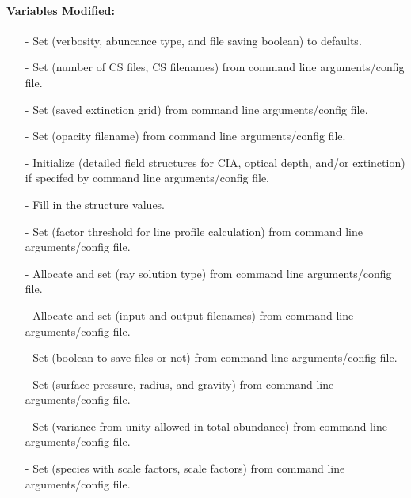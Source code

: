 \documentclass[letterpaper,12pt]{article}
\begin{document}
\paragraph{Variables Modified:}
\begin{enumerate}[leftmargin=10pt, noitemsep, parsep=0pt, topsep=0ex]
\item[-] Set  (verbosity, abuncance type, and file saving boolean) to defaults.
\item[-] Set  (number of CS files, CS filenames) from command line arguments/config file.
\item[-] Set  (saved extinction grid) from command line arguments/config file.
\item[-] Set  (opacity filename) from command line arguments/config file.
\item[-] Initialize  (detailed field structures for CIA, optical depth, and/or extinction) if specifed by command line arguments/config file.
\item[-] Fill in the  structure values.
\item[-] Set  (factor threshold for line profile calculation) from command line arguments/config file.
\item[-] Allocate and set  (ray solution type) from command line arguments/config file.
\item[-] Allocate and set  (input and output filenames) from command line arguments/config file.
\item[-] Set  (boolean to save files or not) from command line arguments/config file.
\item[-] Set  (surface pressure, radius, and gravity) from command line arguments/config file.
\item[-] Set  (variance from unity allowed in total abundance) from command line arguments/config file.
\item[-] Set  (species with scale factors, scale factors) from command line arguments/config file.

\end{enumerate}
\end{document}
